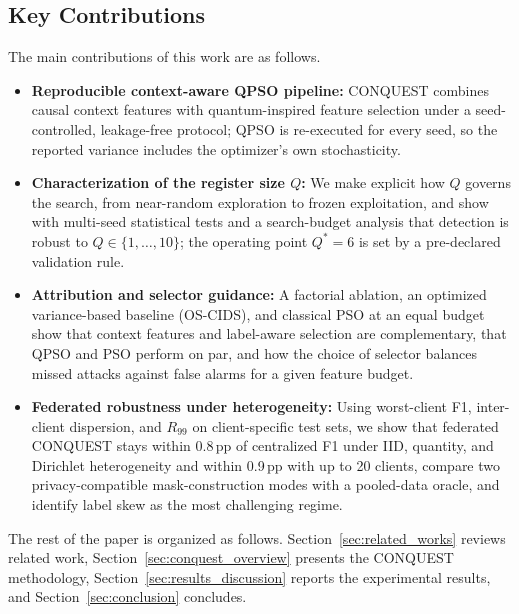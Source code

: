 \documentclass[conference]{IEEEtran}
\begin{document}
\subsection{Key Contributions}
The main contributions of this work are as follows.
\begin{itemize}
    \item \textbf{Reproducible context-aware QPSO pipeline:} CONQUEST
    combines causal context features with quantum-inspired feature
    selection under a seed-controlled, leakage-free protocol;
    QPSO is re-executed for every seed, so the reported
    variance includes the optimizer's own stochasticity.

    \item \textbf{Characterization of the
    register size $Q$:} We make explicit how $Q$ governs
    the search, from near-random exploration to frozen exploitation,
    and show with multi-seed statistical tests and a search-budget
    analysis that detection is robust to $Q\in\{1,\dots,10\}$; the
    operating point $Q^{*}=6$ is set by a pre-declared validation rule.

    \item \textbf{Attribution and selector guidance:}
    A factorial ablation, an optimized variance-based
    baseline (OS-CIDS), and classical PSO at an equal budget show that
    context features and label-aware selection are complementary, that
    QPSO and PSO perform on par, and how the choice of selector balances
    missed attacks against false alarms for a given feature budget.

    \item \textbf{Federated robustness under heterogeneity:}
    Using worst-client F1,
    inter-client dispersion, and $R_{99}$ on client-specific test sets,
    we show that federated CONQUEST stays within 0.8\,pp of centralized
    F1 under IID, quantity, and Dirichlet heterogeneity and within
    0.9\,pp with up to 20 clients, compare two privacy-compatible
    mask-construction modes with a pooled-data oracle, and identify
    label skew as the most
    challenging regime.
\end{itemize}

The rest of the paper is organized as follows.
Section~\ref{sec:related_works} reviews related work,
Section~\ref{sec:conquest_overview} presents the CONQUEST methodology,
Section~\ref{sec:results_discussion} reports the experimental results,
and Section~\ref{sec:conclusion} concludes.
\end{document}
